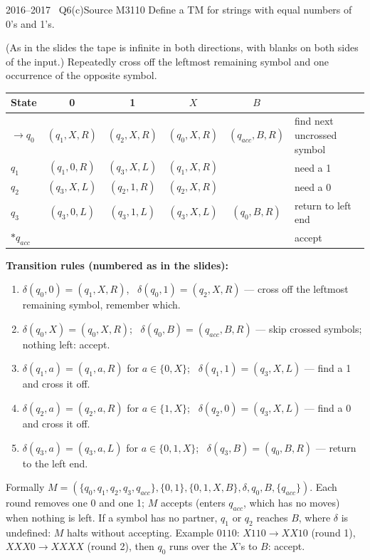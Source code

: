 \documentclass[11pt,a4paper]{article}
\begin{document}
\begin{question}{2016--2017 \textbullet\ Q6(c)}{Source M31}{10}
Define a TM for strings with equal numbers of 0's and 1's.
\end{question}
\begin{solution}
(As in the slides the tape is infinite in both directions, with blanks on both sides of the input.) Repeatedly cross off the leftmost remaining symbol and one occurrence of the opposite symbol.
\begin{center}\small\begin{tabular}{l|cccc|l}\toprule State & 0 & 1 & $X$ & $B$ & \\\midrule
$\to q_0$ & $(q_1,X,R)$ & $(q_2,X,R)$ & $(q_0,X,R)$ & $(q_{acc},B,R)$ & find next uncrossed symbol\\
$q_1$ & $(q_1,0,R)$ & $(q_3,X,L)$ & $(q_1,X,R)$ & & need a 1\\
$q_2$ & $(q_3,X,L)$ & $(q_2,1,R)$ & $(q_2,X,R)$ & & need a 0\\
$q_3$ & $(q_3,0,L)$ & $(q_3,1,L)$ & $(q_3,X,L)$ & $(q_0,B,R)$ & return to left end\\
$*q_{acc}$ & & & & & accept\\\bottomrule\end{tabular}\end{center}
\par\noindent\textbf{Transition rules (numbered as in the slides):}
{\small\begin{enumerate}[label=\arabic*.,itemsep=0pt]
\item $\delta(q_0,0)=(q_1,X,R)$, \ $\delta(q_0,1)=(q_2,X,R)$ --- cross off the leftmost remaining symbol, remember which.
\item $\delta(q_0,X)=(q_0,X,R)$; \ $\delta(q_0,B)=(q_{acc},B,R)$ --- skip crossed symbols; nothing left: accept.
\item $\delta(q_1,a)=(q_1,a,R)$ for $a\in\{0,X\}$; \ $\delta(q_1,1)=(q_3,X,L)$ --- find a 1 and cross it off.
\item $\delta(q_2,a)=(q_2,a,R)$ for $a\in\{1,X\}$; \ $\delta(q_2,0)=(q_3,X,L)$ --- find a 0 and cross it off.
\item $\delta(q_3,a)=(q_3,a,L)$ for $a\in\{0,1,X\}$; \ $\delta(q_3,B)=(q_0,B,R)$ --- return to the left end.
\end{enumerate}}
Formally $M=(\{q_0,q_1,q_2,q_3,q_{acc}\},\{0,1\},\{0,1,X,B\},\delta,q_0,B,\{q_{acc}\})$. Each round removes one 0 and one 1; $M$ accepts (enters $q_{acc}$, which has no moves) when nothing is left. If a symbol has no partner, $q_1$ or $q_2$ reaches $B$, where $\delta$ is undefined: $M$ halts without accepting. Example $0110$: $X110\to XX10$ (round 1), $XXX0\to XXXX$ (round 2), then $q_0$ runs over the $X$'s to $B$: accept.
\end{solution}
\end{document}
